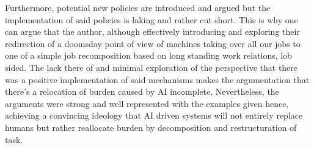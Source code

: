 \documentclass[a4paper,11pt,oneside]{report}
\begin{document}
Furthermore, potential new policies are introduced and argued but the implementation of said policies is laking and rather cut short. This is why one can argue that the author, although effectively introducing and exploring their redirection of a doomsday point of view of machines taking over all our jobs to one of a simple job recomposition based on long standing work relations, lob sided. The lack there of and minimal exploration of the perspective that there was a positive implementation of said mechanisms makes the argumentation that there's a relocation of burden caused by AI incomplete. Nevertheless, the arguments were strong and well represented with the examples given hence, achieving a convincing ideology that AI driven systems will not entirely replace humans but rather reallocate burden by decomposition and restructuration of task.


\cleardoublepage
{}
{}

%
%
\end{document}
